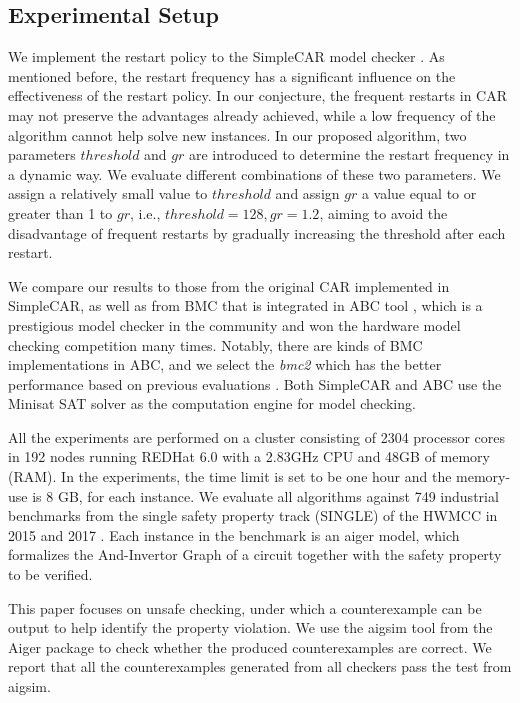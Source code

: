 \subsection{Experimental Setup}
We implement the restart policy to the SimpleCAR model checker \cite{simplecar}. As mentioned before, the restart frequency has a significant influence on the effectiveness of the restart policy. In our conjecture, the frequent restarts in CAR may not preserve the advantages already achieved, while a low frequency of the algorithm cannot help solve new instances. In our proposed algorithm, two parameters $threshold$ and $gr$ are introduced to determine the restart frequency in a dynamic way. We evaluate different combinations of these two parameters. We assign a relatively small value to $threshold$ and assign $gr$ a value equal to or greater than 1 to $gr$, i.e., $threshold = 128, gr = 1.2$, aiming to avoid the disadvantage of frequent restarts by gradually increasing the threshold after each restart. 

We compare our results to those from the original CAR implemented in SimpleCAR, as well as from BMC that is integrated in ABC tool \cite{BM10}, which is a prestigious model checker in the community and won the hardware model checking competition many times. Notably, there are kinds of BMC implementations in ABC, and we select the \emph{bmc2} which has the better performance based on previous evaluations \cite{LDPRV18}. Both SimpleCAR and ABC use the Minisat SAT solver \cite{minisat,ES04} as the computation engine for model checking. 

All the experiments are performed on a cluster consisting of 2304 processor cores in 192 nodes running REDHat 6.0 with a 2.83GHz CPU and 48GB of memory (RAM). In the experiments, the time limit is set to be one hour and the memory-use is 8 GB, for each instance.
We evaluate all algorithms against 749 industrial benchmarks from the single safety property track (SINGLE) of the HWMCC in 2015 \cite{hwmcc15} and 2017 \cite{hwmcc17}. Each instance in the benchmark is an aiger model, which formalizes the And-Invertor Graph \cite{aiger} of a circuit together with the safety property to be verified. 

This paper focuses on unsafe checking, under which a counterexample can be output to help identify the property violation. We use the aigsim tool from the Aiger package \cite{aigertools} to check whether the produced counterexamples are correct. We report that all the counterexamples generated from all checkers pass the test from aigsim.

